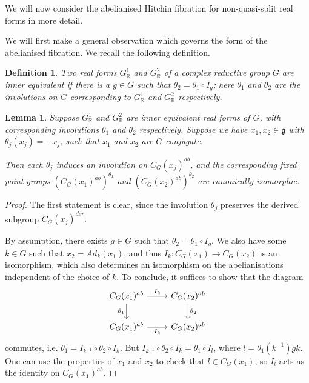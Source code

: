 \documentclass{amsart}
\newtheorem{lemma}[theorem]{Lemma}
\newtheorem{definition}[theorem]{Definition}
\theoremstyle{remark}
\numberwithin{theorem}{section}
\numberwithin{equation}{section}
\begin{document}
We will now consider the abelianised Hitchin fibration for non-quasi-split real forms in more detail.

We will first make a general observation which governs the form of the abelianised fibration. We recall the following definition.

\begin{definition}\label{InnerRealFormsdef}
  Two real forms $G^1_{\mathbb{R}}$ and $G^2_{\mathbb{R}}$ of a complex reductive group $G$ are \emph{inner equivalent} if there is a $g \in G$ such that $\theta_2 = \theta_1 \circ I_g$; here $\theta_1$ and $\theta_2$ are the involutions on $G$ corresponding to $G^1_{\mathbb{R}}$ and $G^2_{\mathbb{R}}$ respectively.
\end{definition}

\begin{lemma}\label{InnerRealFormslem}
    Suppose $G^1_{\mathbb{R}}$ and $G^2_{\mathbb{R}}$ are inner equivalent real forms of $G$, with corresponding involutions $\theta_1$ and $\theta_2$ respectively. Suppose we have $x_1, x_2 \in \mathfrak{g}$ with $\theta_j(x_j)=-x_j$, such that $x_1$ and $x_2$ are $G$-conjugate.

    Then each $\theta_j$ induces an involution on $C_G(x_j)^{ab}$, and the corresponding fixed point groups $(C_G(x_1)^{ab})^{\theta_1}$ and $(C_G(x_2)^{ab})^{\theta_2}$ are canonically isomorphic. 
\end{lemma}

\begin{proof}
The first statement is clear, since the involution $\theta_j$ preserves the derived subgroup $C_G(x_j)^{der}$.

By assumption, there exists $g \in G$ such that $\theta_2 = \theta_1 \circ I_g$. We also have some $k \in G$ such that $x_2 = Ad_k(x_1)$, and thus $I_k:C_G(x_1) \rightarrow C_G(x_2)$ is an isomorphism, which also determines an isomorphism on the abelianisations independent of the choice of $k$. To conclude, it suffices to show that the diagram
\begin{equation}\label{InnerRealFormseqn}
\begin{tikzcd}
C_G(x_1)^{ab} \arrow[r, "I_k"] \arrow[d, "\theta_1"'] & C_G(x_2)^{ab} \arrow[d, "\theta_2"] \\
C_G(x_1)^{ab} \arrow[r, "I_k"']                       & C_G(x_2)^{ab}                      
\end{tikzcd}
\end{equation}
commutes, i.e. $\theta_1 = I_{k^{-1}} \circ \theta_2 \circ I_k$. But $I_{k^{-1}} \circ \theta_2 \circ I_k = \theta_1 \circ I_l$, where $l = \theta_1(k^{-1})gk$. One can use the properties of $x_1$ and $x_2$ to check that $l \in C_G(x_1)$, so $I_l$ acts as the identity on $C_G(x_1)^{ab}$.
\end{proof}
\end{document}
